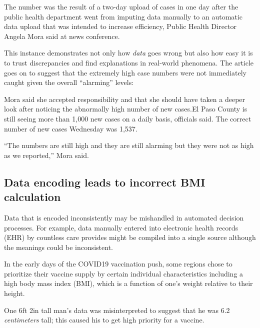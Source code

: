 \documentclass[
]{krantz}
\renewenvironment{quote}{\begin{VF}}{\end{VF}}
\begin{document}
\begin{quote}
The number was the result of a two-day upload of cases in one day after the public health department went from imputing data manually to an automatic data upload that was intended to increase efficiency, Public Health Director Angela Mora said at news conference.
\end{quote}

This instance demonstrates not only how \emph{data} goes wrong but also how easy it is to trust discrepancies and find explanations in real-world phenomena.
The article goes on to suggest that the extremely high case numbers were not immediately caught given the overall ``alarming'' levels:

\begin{quote}
Mora said she accepted responsibility and that she should have taken a deeper look after noticing the abnormally high number of new cases.El Paso County is still seeing more than 1,000 new cases on a daily basis, officials said. The correct number of new cases Wednesday was 1,537.
\end{quote}

\begin{quote}
``The numbers are still high and they are still alarming but they were not as high as we reported,'' Mora said.
\end{quote}

\hypertarget{data-encoding-leads-to-incorrect-bmi-calculation}{%
\subsection{Data encoding leads to incorrect BMI calculation}\label{data-encoding-leads-to-incorrect-bmi-calculation}}

Data that is encoded inconsistently may be mishandled in automated decision processes.
For example, data manually entered into electronic health records (EHR) by countless care provides might be compiled into a single source although the meanings could be inconsistent.

In the early days of the COVID19 vaccination push, some regions chose to prioritize their vaccine supply by certain individual characteristics including a high body mass index (BMI), which is a function of one's weight relative to their height.

One 6ft 2in tall man's data was misinterpreted to suggest that he was 6.2 \emph{centimeters} tall; this caused his to get high priority for a vaccine.
\end{document}
